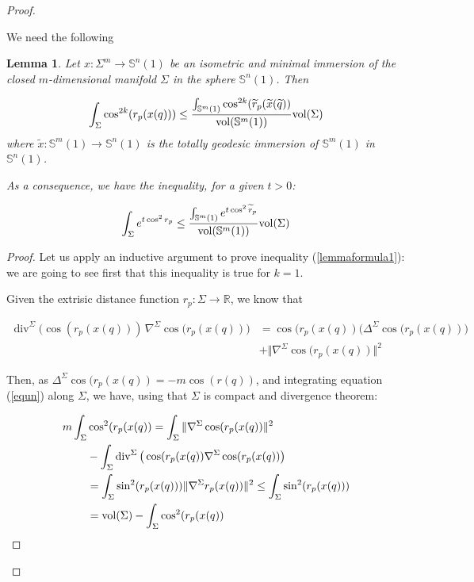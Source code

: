 \documentclass{amsart}
\newtheorem{lemma}[theorem]{Lemma}
\theoremstyle{definition}
\theoremstyle{remark}
\newcommand{\Div}{\operatorname{div}}
\newcommand{\erre}{\mathbb{R}}
\newcommand{\ese}{\mathbb{S}}
\begin{document}
\begin{proof}\

We need the following 

\begin{lemma}
Let  $x: \Sigma^m \to \mathbb{S}^n(1)$ be an isometric and minimal immersion of the closed $m$-dimensional manifold $\Sigma$ in the sphere  $\mathbb{S}^n(1)$. Then

\begin{equation}\label{lemmaformula1}
\int_\Sigma \cos^{2k}(r_p(x(q))) \leq \frac{\int_{\mathbb{S}^m(1)} \cos^{2k}(\widetilde{r}_p(\widetilde{x}(\widetilde{q}))}{{\rm vol}(\mathbb{S}^m(1))} {\rm vol}(\Sigma)
\end{equation}
\noindent where  $\widetilde{x}: \mathbb{S}^m(1) \rightarrow \mathbb{S}^n(1)$ is the totally geodesic immersion of $\ese^m(1)$ in $\ese^n(1)$.   

As a consequence, we have the inequality,  for a given $t>0$:

\begin{equation}\label{lemmaformula2}
\int_{\Sigma} e^{t \cos^2r_p}  \leq\frac{\int_{\ese^m(1)} e^{t \cos^2\widetilde{r}_p}}{{\rm vol}(\mathbb{S}^m(1))} {\rm vol}(\Sigma)
\end{equation}
\end{lemma}
\begin{proof}

Let us apply an inductive argument to prove inequality (\ref{lemmaformula1}): we are going to see first that this inequality is true for $k=1$. 

Given the extrisic distance function $r_p: \Sigma \rightarrow \erre$, we know that

\begin{equation}\label{equn}
\begin{aligned}
\Div^\Sigma\big(\cos (r_p(x(q)))\,\nabla^\Sigma \cos(r_p(x(q))\big)&=\cos(r_p(x(q))\big(\Delta^\Sigma\cos(r_p(x(q))\big)\\&+\Vert \nabla^\Sigma \cos(r_p(x(q))\Vert^2
\end{aligned}
\end{equation}

 \noindent Then, as $\Delta^\Sigma \cos(r_p(x(q))=-m\cos(r(q))$, and integrating equation (\ref{equn}) along $\Sigma$, we have, using that $\Sigma$ is compact and divergence theorem:

\begin{equation}\label{eqdoss}
\begin{aligned}
m\int_\Sigma& \cos^2(r_p(x(q))=\int_\Sigma\Vert \nabla^{\Sigma}  \cos(r_p(x(q))\Vert^2\\&-\int_\Sigma \Div^\Sigma\big(\cos(r_p(x(q))\nabla^\Sigma \cos(r_p(x(q))\big)
\\&=\int_\Sigma \sin^2(r_p(x(q)))\Vert \nabla^{\Sigma} r_p(x(q))\Vert^2\leq \int_\Sigma \sin^2(r_p(x(q)))\\&={\rm vol}(\Sigma)- \int_\Sigma \cos^2(r_p(x(q))
\end{aligned}
\end{equation}


\end{proof}
\end{proof}
\end{document}
